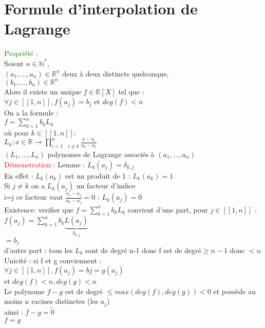 \documentclass{article}
\begin{document}
	\section{Formule d'interpolation de Lagrange}
	\textcolor{green}{Propriété :} \\
	Soient $ n \in \mathbb{N}^*$, \\ 
	\indent $(a_1,...,a_n) \in \mathbb{R}^n$ deux à deux distincts quelconque, \\ 
	\indent $(b_1,...,b_n) \in \mathbb{R}^n$ \\
	Alors il existe un unique $f \in \mathbb{R}[X]$ tel que : \\
	$ \forall j \in [[1,n]], f(a_j)=b_j$ et $deg(f)<n$ \\
	On a la formule : \\
	\indent $f = \sum_{k=1}^nb_k L_k$ \\
	où pour $k \in [[1,n]] :$ \\
	\indent $L_k : x \in \mathbb{R} \rightarrow \prod_{i=1\quad i \neq k}^n \frac{x-a_i}{a_k-a_i}$ \\
	$(L_1,...,L_n)$ polynomes de Lagrange associés à $(a_1,...,a_n)$ \\
	\textcolor{red}{Démonstration :} Lemme : $L_k(a_j) = \delta_{k,j}$ \\
	En effet : $L_k(a_k)$ est un produit de 1 : $L_k(a_k)=1$ \\
	Si $j \neq k$ on a  $L_k(a_j)$ un facteur d'indice  \\
	i=j ce facteur vaut $\frac{a_j-a_j}{a_k-a_j}=0$ : $L_k(a_j)=0$ \\
	Existence: verifier que $f = \sum_{k=1}^n b_k L_k$ convient d'une part, pour $j \in [[1,n]]$ : \\
	$f(a_j)= \sum^n_{k=1} b_k \underbrace{L(a_j)}_{\delta_{k,j}}$ \\
	\indent $= b_j$ \\
	d'autre part : tous les $L_k$ sont de degré n-1 donc f est de degré$ \geq n-1 $ donc $< n$ \\
	Unicité : si f et g conviennent : \\
	\indent $\forall j \in [[1,n]], f(a_j)=bj=g(a_j)$ \\
	et $deg(f)<n, deg(g)<n$ \\
	Le polynome $f-g$ est de degré $\leq max(deg(f),deg(g))<0$ et possède au moins n racines distinctes (les $a_j$) \\
	ainsi : $f-g= \tilde{0}$ \\
	$f=g$
\end{document}
